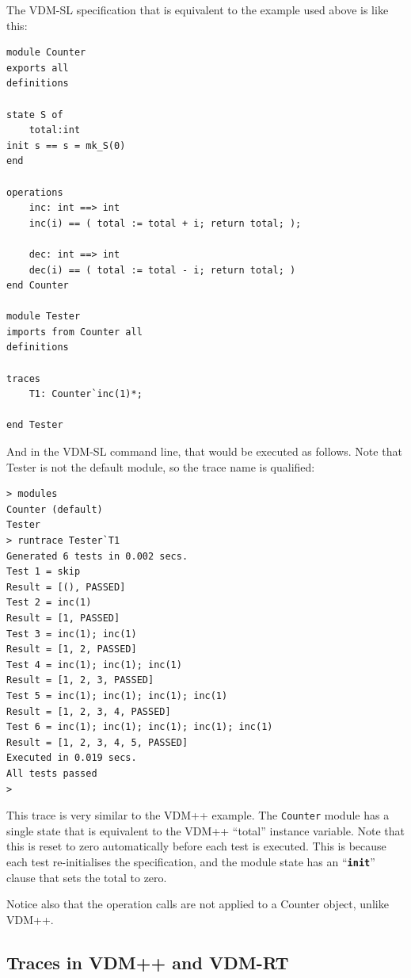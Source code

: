 \documentclass{overturerepchap}
\begin{document}
The VDM-SL specification that is equivalent to the example used above is like
this:

\small
\begin{lstlisting}
module Counter
exports all
definitions

state S of
    total:int
init s == s = mk_S(0)
end

operations
    inc: int ==> int
    inc(i) == ( total := total + i; return total; );

    dec: int ==> int
    dec(i) == ( total := total - i; return total; )
end Counter

module Tester
imports from Counter all
definitions

traces
    T1: Counter`inc(1)*;

end Tester
\end{lstlisting}
\normalsize

And in the VDM-SL command line, that would be executed as follows. Note that
Tester is not the default module, so the trace name is qualified:

\scriptsize
\lstset{style=tool,language=}
\begin{lstlisting}[escapechar=@]
> modules
Counter (default)
Tester
> runtrace Tester`T1
Generated 6 tests in 0.002 secs. 
Test 1 = skip
Result = [(), PASSED]
Test 2 = inc(1)
Result = [1, PASSED]
Test 3 = inc(1); inc(1)
Result = [1, 2, PASSED]
Test 4 = inc(1); inc(1); inc(1)
Result = [1, 2, 3, PASSED]
Test 5 = inc(1); inc(1); inc(1); inc(1)
Result = [1, 2, 3, 4, PASSED]
Test 6 = inc(1); inc(1); inc(1); inc(1); inc(1)
Result = [1, 2, 3, 4, 5, PASSED]
Executed in 0.019 secs. 
All tests passed
>
\end{lstlisting}
\lstset{style=mystyle}
\lstset{language=VDM++}
\normalsize

This trace is very similar to the VDM++ example. The \texttt{Counter} module has a
single state that is equivalent to the VDM++ ``total'' instance variable. Note
that this is reset to zero automatically before each test is executed. This is
because each test re-initialises the specification, and the module
state has an ``\texttt{\textbf{init}}'' clause that sets the total to zero.

Notice also that the operation calls are not applied to a Counter object, unlike
VDM++.

\subsection{Traces in VDM++ and VDM-RT}
\end{document}
